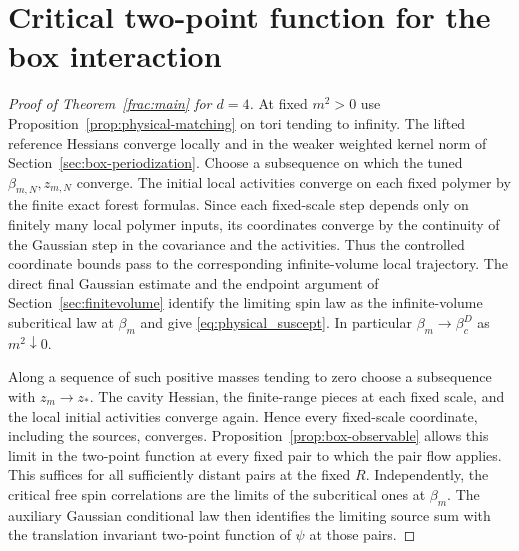 \documentclass[11pt]{article}
\begin{document}
\section{Critical two-point function for the box interaction}
\label{sec:physical-conclusion}


\begin{proof}[Proof of Theorem~\ref{frac:main} for \(d=4\)]
At fixed \(m^2>0\) use Proposition~\ref{prop:physical-matching}
on tori tending to infinity. The lifted reference Hessians
converge locally and in the weaker weighted kernel norm
of Section~\ref{sec:box-periodization}. Choose a subsequence on
which the tuned \(\beta_{m,N},z_{m,N}\) converge. The
initial local activities converge on each fixed polymer
by the finite exact forest formulas. Since each fixed-scale
step depends only on finitely many local polymer inputs,
its coordinates converge by the continuity of the Gaussian
step in the covariance and the activities. Thus the
controlled coordinate bounds pass to the corresponding
infinite-volume local trajectory. The direct final Gaussian
estimate and the endpoint argument of
Section~\ref{sec:finitevolume} identify the limiting spin
law as the infinite-volume subcritical law at \(\beta_m\)
and give \eqref{eq:physical_suscept}. In particular
\(\beta_m\to\beta_c^D\) as \(m^2\downarrow0\).

Along a sequence of such positive masses tending to zero
choose a subsequence with \(z_m\to z_*\). The cavity Hessian,
the finite-range pieces at each fixed scale, and the local
initial activities converge again. Hence every fixed-scale
coordinate, including the sources, converges. Proposition~\ref{prop:box-observable} allows this limit in
the two-point function at every fixed pair to which the pair
flow applies. This suffices for all sufficiently distant pairs
at the fixed \(R\). Independently, the critical free spin
correlations are the limits of the subcritical ones at
\(\beta_m\). The auxiliary Gaussian conditional law then
identifies the limiting source sum with the translation
invariant two-point function of \(\psi\) at those pairs.


\end{proof}
\end{document}
